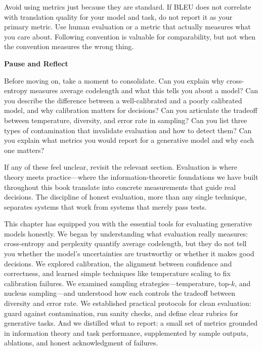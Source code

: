 Avoid using metrics just because they are standard. If BLEU does not correlate with translation quality for your model and task, do not report it as your primary metric. Use human evaluation or a metric that actually measures what you care about. Following convention is valuable for comparability, but not when the convention measures the wrong thing.

\vspace{2em}


\begin{pausebox}
\textbf{Pause and Reflect}

\vspace{0.3cm}

Before moving on, take a moment to consolidate. Can you explain why cross-entropy measures average codelength and what this tells you about a model? Can you describe the difference between a well-calibrated and a poorly calibrated model, and why calibration matters for decisions? Can you articulate the tradeoff between temperature, diversity, and error rate in sampling? Can you list three types of contamination that invalidate evaluation and how to detect them? Can you explain what metrics you would report for a generative model and why each one matters?

\vspace{0.3cm}

If any of these feel unclear, revisit the relevant section. Evaluation is where theory meets practice---where the information-theoretic foundations we have built throughout this book translate into concrete measurements that guide real decisions. The discipline of honest evaluation, more than any single technique, separates systems that work from systems that merely pass tests.
\end{pausebox}

\vspace{1em}

This chapter has equipped you with the essential tools for evaluating generative models honestly. We began by understanding what evaluation really measures: cross-entropy and perplexity quantify average codelength, but they do not tell you whether the model's uncertainties are trustworthy or whether it makes good decisions. We explored calibration, the alignment between confidence and correctness, and learned simple techniques like temperature scaling to fix calibration failures. We examined sampling strategies---temperature, top-$k$, and nucleus sampling---and understood how each controls the tradeoff between diversity and error rate. We established practical protocols for clean evaluation: guard against contamination, run sanity checks, and define clear rubrics for generative tasks. And we distilled what to report: a small set of metrics grounded in information theory and task performance, supplemented by sample outputs, ablations, and honest acknowledgment of failures.

